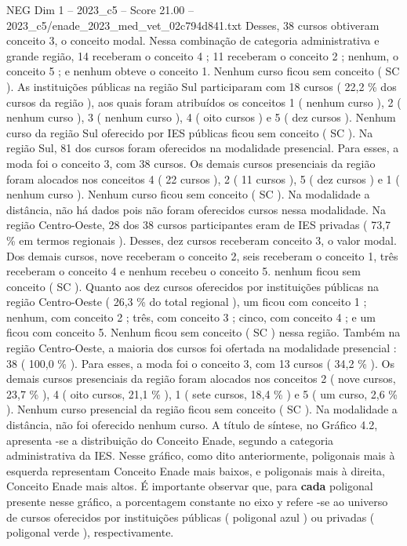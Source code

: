 \begin{textsample}{NEG Dim 1 – 2023\_c5 – Score 21.00 – 2023\_c5/enade\_2023\_med\_vet\_02c794d841.txt}
Desses, 38 cursos obtiveram conceito 3, o conceito modal.
Nessa combinação de categoria administrativa e grande região, 14 receberam o conceito 4 ; 11 receberam o conceito 2 ; nenhum, o conceito 5 ; e nenhum obteve o conceito 1.
Nenhum curso ficou sem conceito ( SC ).
As instituições públicas na região Sul participaram com 18 cursos ( 22,2 \% dos cursos da região ), aos quais foram atribuídos os conceitos 1 ( nenhum curso ), 2 ( nenhum curso ), 3 ( nenhum curso ), 4 ( oito cursos ) e 5 ( dez cursos ).
Nenhum curso da região Sul oferecido por IES públicas ficou sem conceito ( SC ).
Na região Sul, 81 dos cursos foram oferecidos na modalidade presencial.
Para esses, a moda foi o conceito 3, com 38 cursos.
Os demais cursos presenciais da região foram alocados nos conceitos 4 ( 22 cursos ), 2 ( 11 cursos ), 5 ( dez cursos ) e 1 ( nenhum curso ).
Nenhum curso ficou sem conceito ( SC ).
Na modalidade a distância, não há dados pois não foram oferecidos cursos nessa modalidade.
Na região Centro-Oeste, 28 dos 38 cursos participantes eram de IES privadas ( 73,7 \% em termos regionais ).
Desses, dez cursos receberam conceito 3, o valor modal.
Dos demais cursos, nove receberam o conceito 2, seis receberam o conceito 1, três receberam o conceito 4 e nenhum recebeu o conceito 5. nenhum ficou sem conceito ( SC ).
Quanto aos dez cursos oferecidos por instituições públicas na região Centro-Oeste ( 26,3 \% do total regional ), um ficou com conceito 1 ; nenhum, com conceito 2 ; três, com conceito 3 ; cinco, com conceito 4 ; e um ficou com conceito 5.
Nenhum ficou sem conceito ( SC ) nessa região.
Também na região Centro-Oeste, a maioria dos cursos foi ofertada na modalidade presencial : 38 ( 100,0 \% ).
Para esses, a moda foi o conceito 3, com 13 cursos ( 34,2 \% ).
Os demais cursos presenciais da região foram alocados nos conceitos 2 ( nove cursos, 23,7 \% ), 4 ( oito cursos, 21,1 \% ), 1 ( sete cursos, 18,4 \% ) e 5 ( um curso, 2,6 \% ).
Nenhum curso presencial da região ficou sem conceito ( SC ).
Na modalidade a distância, não foi oferecido nenhum curso.
A título de síntese, no Gráfico 4.2, apresenta -se a distribuição do Conceito Enade, segundo a categoria administrativa da IES.
Nesse gráfico, como dito anteriormente, poligonais mais à esquerda representam Conceito Enade mais baixos, e poligonais mais à direita, Conceito Enade mais altos.
É importante observar que, para \textbf{cada} poligonal presente nesse gráfico, a porcentagem constante no eixo y refere -se ao universo de cursos oferecidos por instituições públicas ( poligonal azul ) ou privadas ( poligonal verde ), respectivamente.

\end{textsample}
